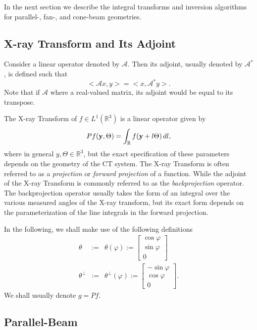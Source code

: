 \documentclass[11pt]{article}
\begin{document}
In the next section we describe the integral transforms and inversion algorithms for parallel-, fan-, and cone-beam geometries.

\subsection{X-ray Transform and Its Adjoint}

Consider a linear operator denoted by $\mathcal{A}$.  Then its adjoint, usually denoted by $\mathcal{A}^*$, is defined such that $$<\mathcal{A}x, y> = <x, \mathcal{A}^*y>.$$  Note that if $\mathcal{A}$ where a real-valued matrix, its adjoint would be equal to its transpose.

The X-ray Transform of $f \in L^1(\mathbb{R}^3)$ is a linear operator given by
\begin{eqnarray*}
    Pf(\textbf{y}, \Theta) = \int_\mathbb{R} f(\textbf{y} + l\Theta) \, dl,
\end{eqnarray*}
where in general $y, \Theta \in \mathbb{R}^3$, but the exact specification of these parameters depends on the geometry of the CT system.  The X-ray Transform is often referred to as a \textit{projection} or \textit{forward projection} of a function.  While the adjoint of the X-ray Transform is commonly referred to as the \textit{backprojection} operator.  The backprojection operator usually takes the form of an integral over the various measured angles of the X-ray transform, but its exact form depends on the parameterization of the line integrals in the forward projection.

In the following, we shall make use of the following definitions
\begin{eqnarray*}
\theta &:=& \theta(\varphi) := \begin{bmatrix} \cos\varphi \\ \sin\varphi \\ 0 \end{bmatrix} \\
\theta^\perp &:=& \theta^\perp(\varphi) := \begin{bmatrix} -\sin\varphi \\ \cos\varphi \\ 0 \end{bmatrix}.
\end{eqnarray*}
We shall usually denote $g = Pf$.

\subsection{Parallel-Beam}
\end{document}
